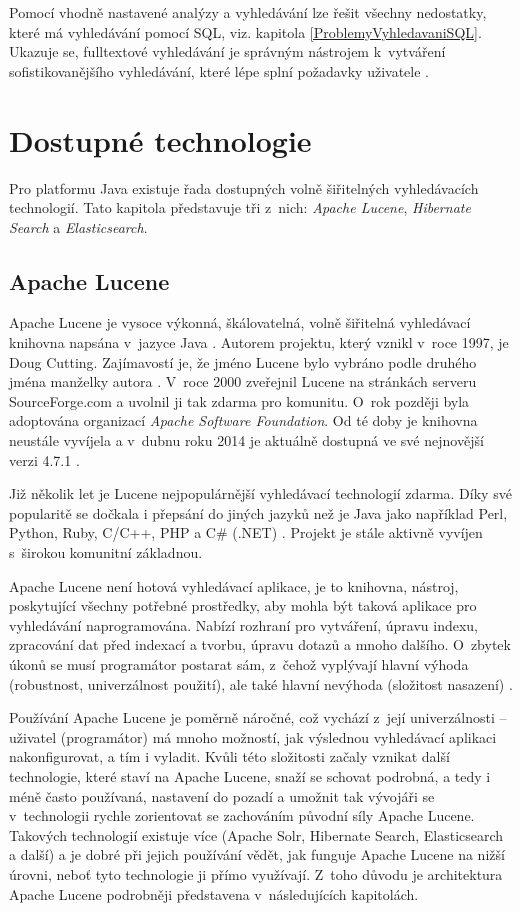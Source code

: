 \documentclass[11pt,oneside]{fithesis2}
\begin{document}
Pomocí vhodně nastavené analýzy a vyhledávání lze řešit všechny nedostatky, které má vyhledávání pomocí SQL, viz. kapitola \ref{ProblemyVyhledavaniSQL}. Ukazuje se, fulltextové vyhledávání je správným nástrojem k~vytváření sofistikovanějšího vyhledávání, které lépe splní požadavky uživatele  \cite[str. 16]{HibernateSearchAction}.

\chapter{Dostupné technologie}
\label{DostupneTechnologieChapter}
Pro platformu Java existuje řada dostupných volně šiřitelných vyhledávacích technologií. Tato kapitola představuje tři z~nich: \emph{Apache Lucene}, \emph{Hibernate Search} a \emph{Elasticsearch}.

\section{Apache Lucene}
Apache Lucene je vysoce výkonná, škálovatelná, volně šiřitelná vyhledávací knihovna napsána v~jazyce Java \cite[s.~6]{LuceneAction}. Autorem projektu, který vznikl v~roce 1997, je Doug Cutting. Zajímavostí je, že jméno Lucene bylo vybráno podle druhého jména manželky autora \cite[s.~6]{LuceneAction}. V~roce 2000 zveřejnil Lucene na stránkách serveru SourceForge.com a uvolnil ji tak zdarma pro komunitu. O~rok později byla adoptována organizací \emph{Apache Software Foundation}. Od té doby je knihovna neustále vyvíjela a v~dubnu roku 2014 je aktuálně dostupná ve své nejnovější verzi 4.7.1 \cite[s.~6]{LuceneAction}.

Již několik let je Lucene nejpopulárnější vyhledávací technologií zdarma. Díky své popularitě se dočkala i přepsání do jiných jazyků než je Java jako například Perl, Python, Ruby, C/C++, PHP a C\# (.NET) \cite[s.~3]{LuceneAction}. Projekt je stále aktivně vyvíjen s~širokou komunitní základnou.

Apache Lucene není hotová vyhledávací aplikace, je to knihovna, nástroj, poskytující všechny potřebné prostředky, aby mohla být taková aplikace pro vyhledávání naprogramována. Nabízí rozhraní pro vytváření, úpravu indexu, zpracování dat před indexací a tvorbu, úpravu dotazů a mnoho dalšího. O~zbytek úkonů se musí programátor postarat sám, z~čehož vyplývají hlavní výhoda (robustnost, univerzálnost použití), ale také hlavní nevýhoda (složitost nasazení) \cite[s.~7]{LuceneAction}.

Používání Apache Lucene je poměrně náročné, což vychází z~její univerzálnosti \cite{ElasticsearchDefinitiveGuide}  -- uživatel (programátor) má mnoho možností, jak výslednou vyhledávací aplikaci nakonfigurovat, a tím i vyladit. Kvůli této složitosti začaly vznikat další technologie, které staví na Apache Lucene, snaží se schovat podrobná, a tedy i méně často používaná, nastavení do pozadí a umožnit tak vývojáři se v~technologii rychle zorientovat se zachováním původní síly Apache Lucene. Takových technologií existuje více (Apache Solr, Hibernate Search, Elasticsearch a další) a je dobré při jejich používání vědět, jak funguje Apache Lucene na nižší úrovni, neboť tyto technologie ji přímo využívají. Z~toho důvodu je architektura Apache Lucene podrobněji představena v~následujících kapitolách.
\end{document}
